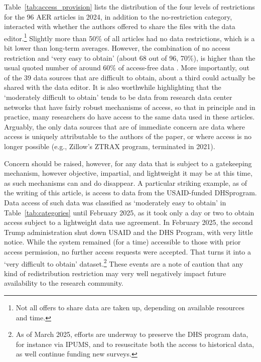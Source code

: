 \documentclass{article}
\begin{document}
Table~\ref{tab:access_provision} lists the distribution of the four levels of restrictions for the 96 AER articles in 2024, in addition to the no-restriction category, interacted with whether the authors offered to share the files with the data editor.\footnote{Not all offers to share data are taken up, depending on available resources and time.}  Slightly more than 50\% of all articles had no data restrictions, which is a bit lower than long-term averages. However, the combination of no access restriction and `very easy to obtain' (about 68 out of 96, 70\%), is higher than the usual quoted number of around 60\% of access-free data \parencite{herbert_reproduce_2024,einav_economics_2014}. More importantly, out of the 39 data sources that are difficult to obtain, about a third could actually be shared with the data editor. It is also worthwhile highlighting that the `moderately difficult to obtain' tends to be data from research data center networks that have fairly robust mechanisms of access, so that in principle and in practice, many researchers do have access to the same data used in these articles. Arguably, the only data sources that are of immediate concern are data where access is uniquely attributable to the authors of the paper, or where access is no longer possible (e.g., Zillow's ZTRAX program, terminated in 2021). 




Concern should be raised, however, for any data that is subject to a gatekeeping mechanism, however objective, impartial, and lightweight it may be at this time, as such mechanisms can and do disappear.  A particular striking example, as of the writing of this article, is access to data from the USAID-funded DHSprogram. Data access of such data was classified as `moderately easy to obtain' in Table~\ref{tab:categories} until February 2025, as it took only a day or two to obtain access subject to a lightweight data use agreement. In February 2025, the second Trump administration shut down USAID and the DHS Program, with very little notice. While the system remained (for a time) accessible to those with prior access permission, no further access requests were accepted. That turns it into a `very difficult to obtain' dataset.\footnote{As of March 2025, efforts are underway to preserve the DHS program data, for instance via IPUMS, and to resuscitate both the access to historical data, as well continue funding new surveys.} These events are a note of caution that any kind of redistribution restriction may very well negatively impact future availability to the research community.
\end{document}
